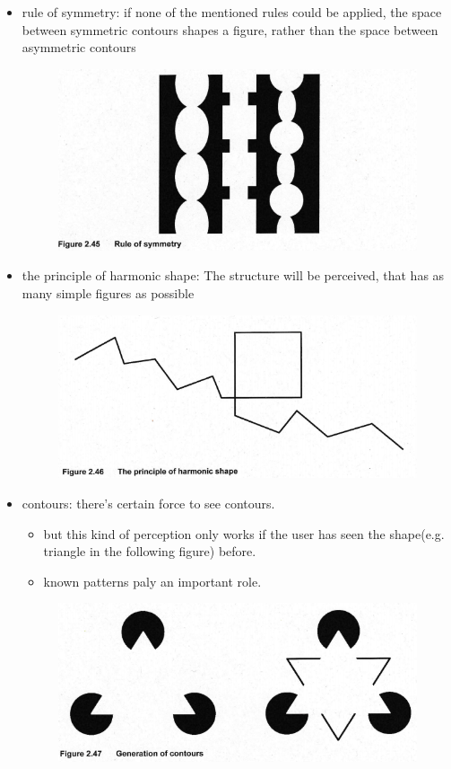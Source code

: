\documentclass{standalone}
\begin{document}
\begin{itemize}
\begin{itemize}
\begin{figure}[H]
				\end{figure}
		\item rule of symmetry: if none of the mentioned rules could be applied, the space between symmetric contours shapes a figure, rather than the space between asymmetric contours
			\begin{figure}[H]
				\centering
				\includegraphics[width = 0.5\linewidth]{Figures/2_45.png}
			\end{figure}
		\item the principle of harmonic shape: The structure will be perceived, that has as many simple figures as possible
			\begin{figure}[H]
			\centering
			\includegraphics[width = 0.5\linewidth]{Figures/2_46.png}
			\end{figure}
		\item contours: there's certain force to see contours.
			\begin{itemize}
				\item but this kind of perception only works if the user has seen the shape(e.g. triangle in the following figure) before.
				\item known patterns paly an important role.
			\end{itemize}
			\begin{figure}[H]
			\centering
			\includegraphics[width = 0.7\linewidth]{Figures/2_47.png}
			\end{figure}
	\end{itemize}
\end{itemize}
\end{document}

